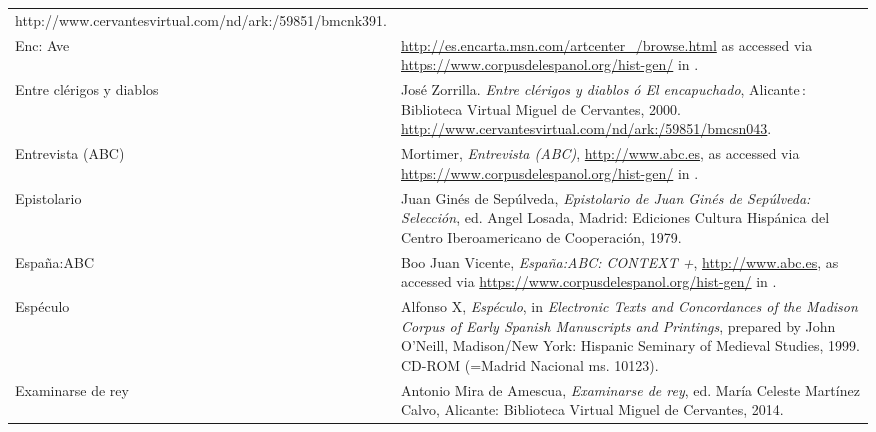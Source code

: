 \begin{tabularx}{\textwidth}{XX}
http://www.cervantesvirtual.com/nd/ark:/59851/bmcnk391.\\
Enc: Ave  & \url{http://es.encarta.msn.com/artcenter_/browse.html} as accessed via \url{https://www.corpusdelespanol.org/hist-gen/} in \citealt{May2021}.\\
Entre clérigos y diablos & José Zorrilla. \textit{Entre clérigos y diablos ó El encapuchado}, Alicante : Biblioteca Virtual Miguel de Cervantes, 2000. \url{http://www.cervantesvirtual.com/nd/ark:/59851/bmcsn043}.\\
Entrevista (ABC) & Mortimer, \textit{Entrevista (ABC)}, \url{http://www.abc.es}, as accessed via \url{https://www.corpusdelespanol.org/hist-gen/} in \citealt{May2021}.\\
Epistolario & Juan Ginés de Sepúlveda, \textit{Epistolario de Juan Ginés de Sepúlveda: Selección}, ed. Angel Losada, Madrid: Ediciones Cultura Hispánica del Centro Iberoamericano de Cooperación, 1979.\\
España:ABC & Boo Juan Vicente, \textit{España:ABC: CONTEXT +}, \url{http://www.abc.es}, as accessed via \url{https://www.corpusdelespanol.org/hist-gen/} in \citealt{May2021}.\\
Espéculo & Alfonso X, \textit{Espéculo}, in \textit{Electronic Texts and Concordances of the Madison Corpus of Early Spanish Manuscripts and Printings}, prepared by John O’Neill, Madison/New York: Hispanic Seminary of Medieval Studies, 1999. CD-ROM (=Madrid Nacional ms. 10123).\\
Examinarse de rey & Antonio Mira de Amescua, \textit{Examinarse de rey}, ed. María Celeste Martínez Calvo, Alicante: Biblioteca Virtual Miguel de Cervantes, 2014. 


\end{tabularx}
